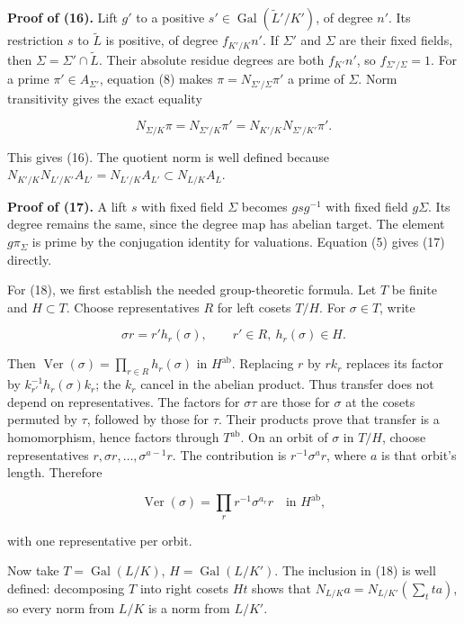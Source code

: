 \documentclass[11pt,a4paper]{article}
\begin{document}
\textbf{Proof of (16).} Lift \(g'\) to a positive
\(s'\in\operatorname{Gal}(\widetilde L'/K')\), of degree \(n'\). Its
restriction \(s\) to \(\widetilde L\) is positive, of degree
\(f_{K'/K}n'\). If \(\Sigma'\) and \(\Sigma\) are their fixed fields,
then \(\Sigma=\Sigma'\cap\widetilde L\). Their absolute residue degrees
are both \(f_{K'}n'\), so \(f_{\Sigma'/\Sigma}=1\). For a prime
\(\pi'\in A_{\Sigma'}\), equation (8) makes
\(\pi=N_{\Sigma'/\Sigma}\pi'\) a prime of \(\Sigma\). Norm transitivity
gives the exact equality

\[
N_{\Sigma/K}\pi
=N_{\Sigma'/K}\pi'
=N_{K'/K}N_{\Sigma'/K'}\pi'.
\]

This gives (16). The quotient norm is well defined because
\(N_{K'/K}N_{L'/K'}A_{L'}=N_{L'/K}A_{L'}\subset N_{L/K}A_L\).

\textbf{Proof of (17).} A lift \(s\) with fixed field \(\Sigma\) becomes
\(gsg^{-1}\) with fixed field \(g\Sigma\). Its degree remains the same,
since the degree map has abelian target. The element \(g\pi_\Sigma\) is
prime by the conjugation identity for valuations. Equation (5) gives
(17) directly.

For (18), we first establish the needed group-theoretic formula. Let
\(T\) be finite and \(H\subset T\). Choose representatives \(R\) for
left cosets \(T/H\). For \(\sigma\in T\), write

\[
\sigma r=r' h_r(\sigma),\qquad r'\in R,\ h_r(\sigma)\in H.
\]

Then \(\operatorname{Ver}(\sigma)=\prod_{r\in R}h_r(\sigma)\) in
\(H^{\mathrm{ab}}\). Replacing \(r\) by \(rk_r\) replaces its factor by
\(k_{r'}^{-1}h_r(\sigma)k_r\); the \(k_r\) cancel in the abelian
product. Thus transfer does not depend on representatives. The factors
for \(\sigma\tau\) are those for \(\sigma\) at the cosets permuted by
\(\tau\), followed by those for \(\tau\). Their products prove that
transfer is a homomorphism, hence factors through \(T^{\mathrm{ab}}\).
On an orbit of \(\sigma\) in \(T/H\), choose representatives
\(r,\sigma r,\ldots,\sigma^{a-1}r\). The contribution is
\(r^{-1}\sigma^a r\), where \(a\) is that orbit's length. Therefore

\[
\operatorname{Ver}(\sigma)=\prod_r r^{-1}\sigma^{a_r}r
\quad\text{in }H^{\mathrm{ab}},
\tag{19}
\]

with one representative per orbit.

Now take \(T=\operatorname{Gal}(L/K)\), \(H=\operatorname{Gal}(L/K')\).
The inclusion in (18) is well defined: decomposing \(T\) into right
cosets \(H t\) shows that \(N_{L/K}a=N_{L/K'}(\sum_t t a)\), so every
norm from \(L/K\) is a norm from \(L/K'\).
\end{document}
